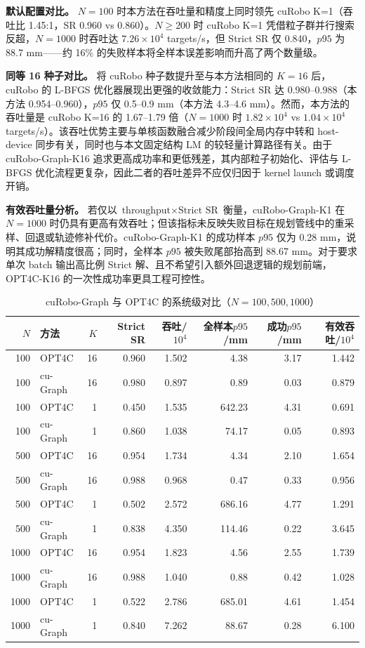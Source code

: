 \documentclass[twocolumn,a4paper,10pt]{ctexart}
\begin{document}
\textbf{默认配置对比。} $N=100$ 时本方法在吞吐量和精度上同时领先 cuRobo K=1（吞吐比 1.45:1，SR 0.960 vs 0.860）。$N\ge200$ 时 cuRobo K=1 凭借粒子群并行搜索反超，$N=1000$ 时吞吐达 $7.26\times10^4$ targets/s，但 Strict SR 仅 0.840，$p95$ 为 88.7 mm——约 16\% 的失败样本将全样本误差影响而升高了两个数量级。

\textbf{同等 16 种子对比。} 将 cuRobo 种子数提升至与本方法相同的 $K=16$ 后，cuRobo 的 L-BFGS 优化器展现出更强的收敛能力：Strict SR 达 0.980--0.988（本方法 0.954--0.960），$p95$ 仅 0.5--0.9 mm（本方法 4.3--4.6 mm）。然而，本方法的吞吐量是 cuRobo K=16 的 1.67--1.79 倍（$N=1000$ 时 $1.82\times10^4$ vs $1.04\times10^4$ targets/s）。该吞吐优势主要与单核函数融合减少阶段间全局内存中转和 host-device 同步有关，同时也与本文固定结构 LM 的较轻量计算路径有关。由于 cuRobo-Graph-K16 追求更高成功率和更低残差，其内部粒子初始化、评估与 L-BFGS 优化流程更复杂，因此二者的吞吐差异不应仅归因于 kernel launch 或调度开销。

\textbf{有效吞吐量分析。} 若仅以 $\text{throughput}\times\text{Strict SR}$ 衡量，cuRobo-Graph-K1 在 $N=1000$ 时仍具有更高有效吞吐；但该指标未反映失败目标在规划管线中的重采样、回退或轨迹修补代价。cuRobo-Graph-K1 的成功样本 $p95$ 仅为 0.28 mm，说明其成功解精度很高；同时，全样本 $p95$ 被失败尾部抬高到 88.67 mm。对于要求单次 batch 输出高比例 Strict 解、且不希望引入额外回退逻辑的规划前端，OPT4C-K16 的一次性成功率更具工程可控性。

\begin{table}[tp]
\centering
\caption{cuRobo-Graph 与 OPT4C 的系统级对比（$N=100,500,1000$）}
\label{tab:curobo}
\scriptsize
\setlength{\tabcolsep}{4pt}
\begin{tabular}{rlrrrrrr}
\toprule
$N$ & 方法 & $K$ & Strict SR & 吞吐/$10^4$ & 全样本$p95$/mm & 成功$p95$/mm & 有效吞吐/$10^4$\\
\midrule
100 & OPT4C & 16 & 0.960 & 1.502 & 4.38 & 3.17 & 1.442\\
100 & cu-Graph & 16 & 0.980 & 0.897 & 0.89 & 0.03 & 0.879\\
100 & OPT4C & 1 & 0.450 & 1.535 & 642.23 & 4.31 & 0.691\\
100 & cu-Graph & 1 & 0.860 & 1.038 & 74.17 & 0.05 & 0.893\\
\midrule
500 & OPT4C & 16 & 0.954 & 1.734 & 4.34 & 2.10 & 1.654\\
500 & cu-Graph & 16 & 0.988 & 0.968 & 0.47 & 0.33 & 0.956\\
500 & OPT4C & 1 & 0.502 & 2.572 & 686.16 & 4.77 & 1.291\\
500 & cu-Graph & 1 & 0.838 & 4.350 & 114.46 & 0.22 & 3.645\\
\midrule
1000 & OPT4C & 16 & 0.954 & 1.823 & 4.56 & 2.55 & 1.739\\
1000 & cu-Graph & 16 & 0.988 & 1.040 & 0.88 & 0.42 & 1.028\\
1000 & OPT4C & 1 & 0.522 & 2.786 & 685.01 & 4.61 & 1.454\\
1000 & cu-Graph & 1 & 0.840 & 7.262 & 88.67 & 0.28 & 6.100\\
\bottomrule
\end{tabular}
\par{}
\end{table}
\end{document}
